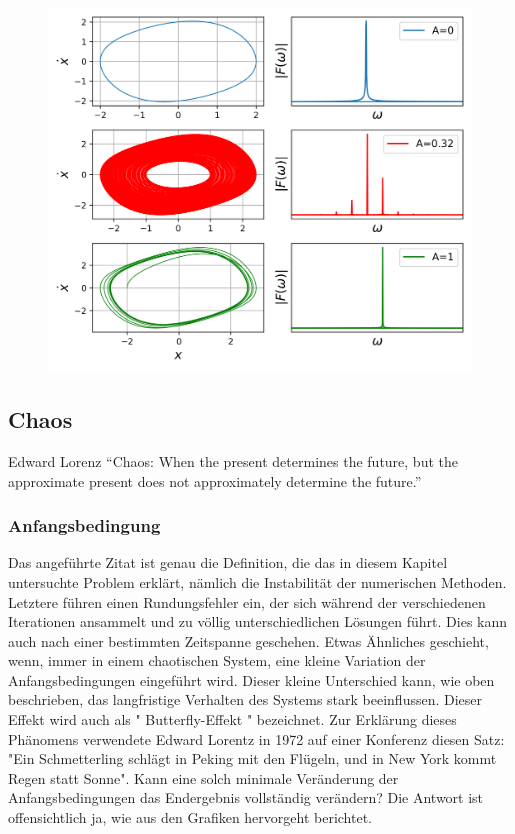 \begin{figure}[ht]
	\centering
	\includegraphics[width=\textwidth]{papers/vanderpol/figures/fft_plot.png}
	\caption{\todo{}\label{vanderpol:figures:fft}}
\end{figure}

\subsection{Chaos}
\label{vanderpol:subsection:chaos}
 
\begin{cquote}[30pt]{Edward Lorenz}
``Chaos: When the present determines the future, but the approximate present does not approximately determine the future.''
\end{cquote}
 
\subsubsection{Anfangsbedingung}
\label{vanderpol:subsubsection:anfangsbedingung}
 
Das angeführte Zitat ist genau die Definition, die das in diesem Kapitel untersuchte Problem erklärt, nämlich die Instabilität der numerischen Methoden. Letztere führen einen Rundungsfehler ein, der sich während der verschiedenen Iterationen ansammelt und zu völlig unterschiedlichen Lösungen führt. Dies kann auch nach einer bestimmten Zeitspanne geschehen.
Etwas Ähnliches geschieht, wenn, immer in einem chaotischen System, eine kleine Variation der Anfangsbedingungen eingeführt wird.  Dieser kleine Unterschied kann, wie oben beschrieben, das langfristige Verhalten des Systems stark beeinflussen. Dieser Effekt wird auch als " Butterfly-Effekt " bezeichnet. Zur Erklärung dieses Phänomens verwendete Edward Lorentz in 1972 auf einer Konferenz diesen Satz: "Ein Schmetterling schlägt in Peking mit den Flügeln, und in New York kommt Regen statt Sonne". Kann eine solch minimale Veränderung der Anfangsbedingungen das Endergebnis vollständig verändern? Die Antwort ist offensichtlich ja, wie aus den Grafiken hervorgeht berichtet.


